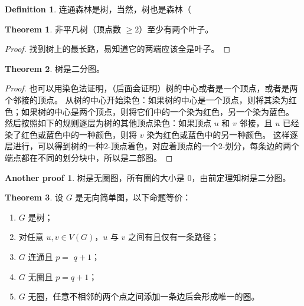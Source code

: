 \documentclass[oneside]{book}
\theoremstyle{definition}
\newtheorem{definition}{Definition}[section]
\newtheorem{theorem}{Theorem}[section]
\newtheorem*{ap}{Another proof}
\begin{document}
\begin{definition}
	连通森林是树，当然，树也是森林（
\end{definition}

\begin{theorem}
	非平凡树（顶点数 \( \geq 2 \)）至少有两个叶子。
\end{theorem}

\begin{proof}
	找到树上的最长路，易知道它的两端应该全是叶子。
\end{proof}

\begin{theorem}
	树是二分图。
\end{theorem}
\begin{proof}
	也可以用染色法证明，（后面会证明）树的中心或者是一个顶点，或者是两个邻接的顶点。
	从树的中心开始染色：如果树的中心是一个顶点，则将其染为红色；如果树的中心是两个顶点，则将它们中的一个染为红色，另一个染为蓝色。
	然后按照如下的规则逐层为树的其他顶点染色：如果顶点 \( u \) 和 \( v \) 邻接，且 \( u \) 已经染了红色或蓝色中的一种颜色，则将 \( v \) 染为红色或蓝色中的另一种颜色。
	这样逐层进行，可以得到树的一种2-顶点着色，对应着顶点的一个2-划分，每条边的两个端点都在不同的划分块中，所以是二部图。
\end{proof}
\begin{ap}
	树是无圈图，所有圈的大小是 \(0\)，由前定理知树是二分图。
\end{ap}
\begin{theorem}
	设 \( G \) 是无向简单图，以下命题等价：
	\begin{enumerate}
		\item \( G \) 是树；
		\item 对任意 \( u, v \in V(G) \)，\( u \) 与 \( v \) 之间有且仅有一条路径；
		\item \( G \) 连通且 \( p = \)  \( q + 1 \)；
		\item \( G \) 无圈且 \( p = q + 1 \)；
		\item \( G \) 无圈，任意不相邻的两个点之间添加一条边后会形成唯一的圈。
	\end{enumerate}
\end{theorem}
\end{document}
